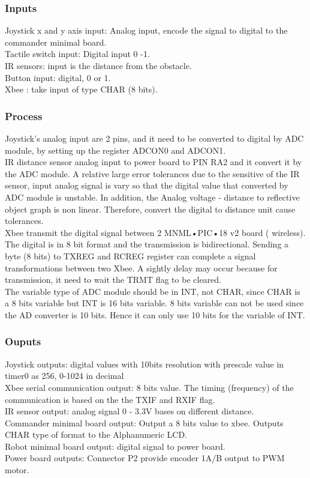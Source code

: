 \documentclass[MTRX3700report.tex]{subfiles}
\begin{document}
\subsubsection{Inputs}

Joystick x and y axis input: Analog input, encode the signal to digital to the commander minimal board.  \\
Tactile switch input: Digital input 0 -1. \\
IR sensors: input is the distance from the obstacle. \\
Button input: digital, 0 or 1.\\
Xbee : take input of type CHAR (8 bits).\\

\subsubsection{Process}
Joystick’s analog input are 2 pins, and it need to be converted to digital by ADC module, by setting up the register ADCON0 and ADCON1. \\
IR distance sensor analog input to power board to PIN RA2 and it convert it by the ADC module. A relative large error tolerances due to the sensitive of the IR sensor, input analog signal is vary so that the digital value that converted by ADC module is unstable. In addition, the Analog voltage - distance to reflective object graph is non linear. Therefore, convert the digital to distance unit cause tolerances.\\
Xbee transmit the digital signal between 2 MNML•PIC•18 v2 board ( wireless). The digital is in 8 bit format and the transmission is bidirectional. Sending a byte (8 bits) to TXREG and RCREG register can complete a signal transformations between two Xbee. A sightly delay may occur because for transmission, it need to wait the TRMT flag to be cleared.\\
The variable type of ADC module should be in INT, not CHAR, since CHAR is a 8 bits variable but INT is 16 bits variable. 8 bits variable can not be used since the AD converter is 10 bits. Hence it can only use 10 bits for the variable of INT. \\

\subsubsection{Ouputs}
Joystick outputs: digital values with 10bits resolution with prescale value in timer0 as 256, 0-1024 in decimal \\
Xbee serial communication output: 8 bits value. The timing (frequency) of the communication is based on the the TXIF and RXIF flag.\\
IR sensor output: analog signal 0 - 3.3V bases on different distance.\\
Commander minimal board output: Output a 8 bits value to xbee. Outputs CHAR type of format to the Alphanumeric LCD.\\
Robot minimal board output: digital signal to power board.\\
Power board outputs: Connector P2 provide encoder 1A/B output to PWM motor.	\\
\end{document}
